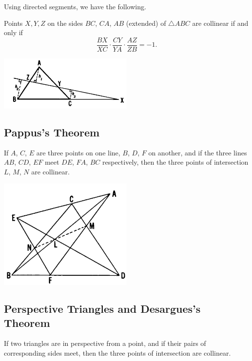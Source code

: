 \documentclass[DIV=12, a4]{scrartcl}
\begin{document}
Using directed segments, we have the following.

\begin{theorem}
	Points $X, Y, Z$ on the sides $BC$, $CA$, $AB$ (extended) of $\triangle ABC$ are collinear if and only if
	$$
	\frac{BX}{XC} \cdot \frac{CY}{YA} \cdot \frac{AZ}{ZB} = -1.
	$$ 
\end{theorem}

 \begin{center}
		\includegraphics[width=0.5\textwidth]{media/3-4B}
\end{center}


\subsection{Pappus's Theorem}

\begin{theorem}
	If $A$, $C$, $E$ are three points on one line, $B$, $D$, $F$ on another, and if the three lines $AB$, $CD$, $EF$ meet $DE$, $FA$, $BC$ respectively, then the three points of intersection $L$, $M$, $N$ are collinear.
\end{theorem}

 \begin{center}
		\includegraphics[width=0.5\textwidth]{media/3-5A}
\end{center}

\subsection{Perspective Triangles and Desargues's Theorem}

\begin{theorem}
	If two triangles are in perspective from a point, and if their pairs of corresponding sides meet, then the three points of intersection are collinear.
\end{theorem}
\end{document}
